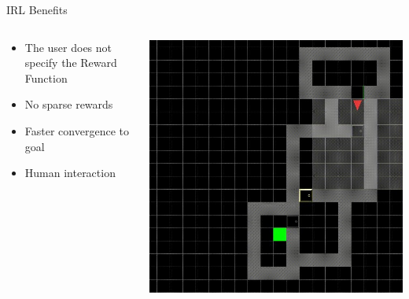 \begin{frame}{IRL Benefits}
	

	\begin{columns}
		\begin{column}{0.5\textwidth}
			
			\begin{itemize}
				\item The user does not specify the Reward Function
				\vspace{0.5cm}
				\item No sparse rewards
				\vspace{0.5cm}
				\item Faster convergence to goal 
				\vspace{0.5cm}
				\item Human interaction
			\end{itemize}
			
		\end{column}
		\begin{column}{0.5\textwidth}
			\centering
			\includegraphics[width=0.7\linewidth]{images/env.jpg}			
		\end{column}
		
	\end{columns}
\end{frame}


